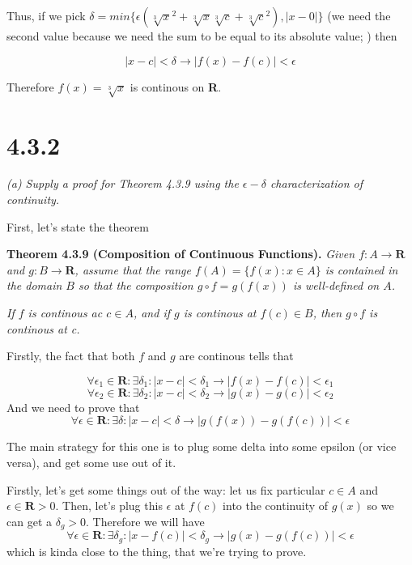 \documentclass[11pt,oneside,titlepage]{article}
\begin{document}
Thus, if we pick $\delta = min\{\epsilon(\sqrt[3]{x}^2 + \sqrt[3]{x}\sqrt[3]{c}
+ \sqrt[3]{c} ^ 2), |x - 0|\}$ (we need the second value
because we need the sum to be equal to its absolute value; ) then

$$|x - c| < \delta \to |f(x)  - f(c)| < \epsilon$$

Therefore $f(x) = \sqrt[3]{x}$ is continous on \textbf{R}.

\section*{4.3.2}

\textit{(a) Supply a proof for Theorem 4.3.9 using the $\epsilon-\delta$
  characterization of continuity.}

First, let's state the theorem

\textbf{Theorem 4.3.9 (Composition of Continuous Functions).} \textit{Given
  $f: A \to \textbf{R}$ and $g: B \to \textbf{R}$, assume that the range
  $f(A) =\{f(x): x \in A\}$ is contained in the domain $B$ so that the
  composition $g \circ f = g(f(x)) $ is well-defined on $A$. }

\textit{If $f$ is continous ac $c \in A$, and if $g$ is continous at
  $f(c) \in B$, then $g \circ f$ is continous at c.}

Firstly, the fact that both $f$ and $g$ are continous tells that

$$\forall \epsilon_1 \in \textbf{R}: \exists \delta_1:  |x - c| < \delta_1 \to
|f(x) - f(c)| < \epsilon_1$$
$$\forall \epsilon_2 \in \textbf{R}: \exists \delta_2: |x - c| < \delta_2 \to
|g(x) - g (c)| < \epsilon_2$$
And we need to prove that
$$\forall \epsilon \in \textbf{R}: \exists \delta: |x - c| < \delta \to
|g(f(x)) - g (f(c))| < \epsilon$$


The main strategy for this one is to plug some delta into some epsilon (or
vice versa), and get some use out of it.

Firstly, let's get some things out of the way: let us fix particular $c \in A$
and $\epsilon \in \textbf{R} > 0$. Then, let's plug this $\epsilon$ at $f(c)$
into the continuity of $g(x)$ so we can get a $\delta_g > 0$. Therefore
we will have
$$ \forall \epsilon \in \textbf{R}: \exists \delta_g: |x - f(c)| < \delta_g
\to |g(x) - g(f(c))| < \epsilon $$
which is kinda close to the thing, that we're trying to prove.
\end{document}
